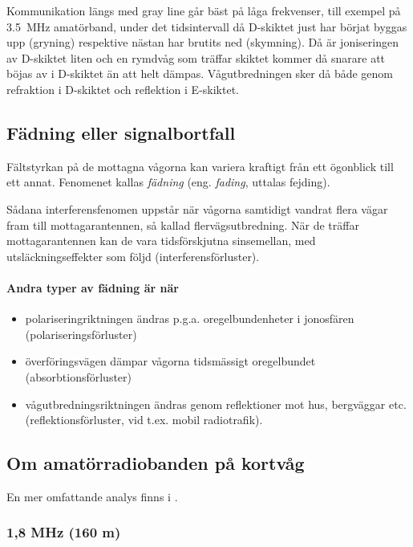Kommunikation längs med gray line går bäst på låga frekvenser, till exempel på
\SI{3,5}{\mega\hertz} amatörband, under det tidsintervall då D-skiktet just
har börjat byggas upp (gryning) respektive nästan har brutits ned (skymning).
Då är joniseringen av D-skiktet liten och en rymdvåg som
träffar skiktet kommer då snarare att böjas av i D-skiktet än att helt dämpas.
Vågutbredningen sker då både genom refraktion i D-skiktet och reflektion i
E-skiktet.

\subsection{Fädning eller signalbortfall}
\label{fädning}

Fältstyrkan på de mottagna vågorna kan variera kraftigt från ett ögonblick till
ett annat.
Fenomenet kallas \emph{fädning} (eng. \emph{fading}, uttalas fejding).

Sådana interferensfenomen uppstår när vågorna samtidigt vandrat flera
vägar fram till mottagarantennen, så kallad flervägsutbredning.
När de träffar mottagarantennen kan de vara tidsförskjutna sinsemellan, med
utsläckningseffekter som följd (interferensförluster).

\newpage %
\paragraph{Andra typer av fädning är när}
\begin{itemize}
\item polariseringriktningen ändras p.g.a. oregelbundenheter i
  jonosfären (polariseringsförluster)
\item överföringsvägen dämpar vågorna tidsmässigt oregelbundet
  (absorbtionsförluster)
\item vågutbredningsriktningen ändras genom reflektioner mot hus,
  bergväggar etc. (reflektionsförluster, vid t.ex. mobil radiotrafik).
\end{itemize}

\subsection{Om amatörradiobanden på kortvåg}
\label{om_kortvågsbanden}

En mer omfattande analys finns i \cite{ARRLHDB2015}.

\subsubsection{1,8 MHz (160 m)}

